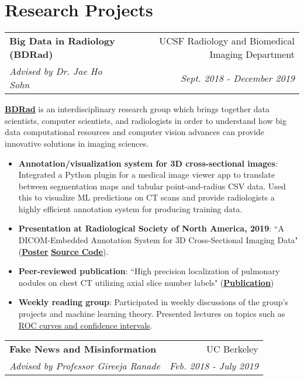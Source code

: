 \documentclass[letterpaper,11pt]{article}
\makeatletter
\newcommand{\resumeItem}[2]{
  \item\small{
    \textbf{#1}{: #2 \vspace{-2pt}}
  }
}
\newcommand{\resumeSubheading}[4]{
  \vspace{-1pt}
    \begin{tabular*}{0.97\textwidth}{l@{\extracolsep{\fill}}r}
      \textbf{#1} & #2 \\
      \textit{\small#3} & \textit{\small #4} \\
    \end{tabular*}\vspace{-5pt}
}
\newcommand{\resumeSubItem}[2]{\resumeItem{#1}{#2}\vspace{-4pt}}
\newcommand{\resumeSubHeadingListStart}{\begin{itemize}[leftmargin=*]}
\newcommand{\resumeSubHeadingListEnd}{\end{itemize}}
\makeatother
\begin{document}
\section{Research Projects}
    \resumeSubheading
      {Big Data in Radiology (BDRad)}{UCSF Radiology and Biomedical Imaging Department}
      {Advised by Dr. Jae Ho Sohn}{Sept. 2018 - December 2019}
      
      \vspace{4mm}
      \href{https://radiology.ucsf.edu/research/labs/physics/big-data}{\textbf{\underline{BDRad}}} is an interdisciplinary research group which brings together data scientists, computer scientists, and radiologists in order to understand how big data computational resources and computer vision advances can provide innovative solutions in imaging sciences.
      
  \resumeSubHeadingListStart
    \resumeSubItem{Annotation/visualization system for 3D cross-sectional images}
      {Integrated a Python plugin for a medical image viewer app to translate between segmentation maps and tabular point-and-radius CSV data. Used this to visualize ML predictions on CT scans and provide radiologists a highly efficient annotation system for producing training data.}
    \resumeSubItem{Presentation at Radiological Society of North America, 2019}{``A DICOM-Embedded Annotation System for 3D Cross-Sectional Imaging Data" (\href{https://github.com/bdrad/pyOsirixScripts/blob/master/rsna2019_poster_aarash.pdf}{\underline{\textbf{Poster}}} \textbar \hspace{0.5mm} \href{https://github.com/aarashy/dicom-viewer}{\underline{\textbf{Source Code}}}).}
    \resumeSubItem{Peer-reviewed publication} {``High precision localization of pulmonary nodules on chest CT utilizing axial slice number labels" (\href{https://link.springer.com/article/10.1186/s12880-021-00594-4}{\underline{\textbf{Publication}}})}
    \resumeSubItem{Weekly reading group}
      {Participated in weekly discussions of the group's projects and machine learning theory. Presented  lectures on topics such as \href{https://docs.google.com/presentation/d/1bq07GSe7ilcrZInrKemy1EVERqXM25jV_axE1Uhba-c/edit?usp=sharing}{ROC curves and confidence intervals}.}
    \resumeSubHeadingListEnd
    
    \vspace{5mm}
    
    \resumeSubheading
      {Fake News and Misinformation}{UC Berkeley}
      {Advised by Professor Gireeja Ranade}{Feb. 2018 - July 2019}
      
\end{document}
